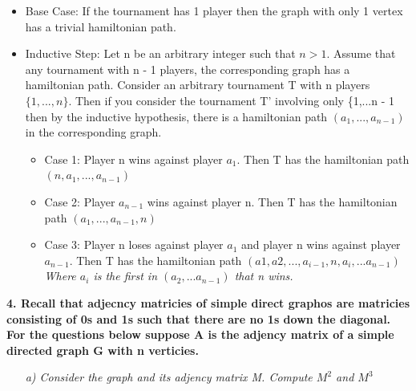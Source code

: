 \documentclass[12pt, letterpaper]{article}
\begin{document}
\begin{itemize}
\item \textnormal{ Base Case: } \newline
\textnormal{ If the tournament has 1 player then the graph with only 1 vertex has a trivial hamiltonian path. }

\item \textnormal{Inductive Step:} \newline
\textnormal{ Let n be an arbitrary integer such that \(n > 1\). Assume that any tournament with n - 1 players, the corresponding graph has a hamiltonian path. } \newline \newline 
\textnormal{ Consider an arbitrary tournament T with n players \(\{1, ..., n\}\). Then if you consider the tournament T' involving only \{1,...n - 1\, then by the inductive hypothesis, there is a hamiltonian path \((a_1,...,a_{n-1})\) in the corresponding graph. }

\begin{itemize}
\item \textnormal{Case 1: Player n wins against player \(a_1\). Then T has the hamiltonian path \((n, a_1,..., a_{n-1})\) }
\item \textnormal{Case 2: Player \(a_{n - 1}\) wins against player n. Then T has the hamiltonian path \((a_1,..., a_{n-1}, n)\) }
\item \textnormal{Case 3: Player n loses against player \(a_1\) and player n wins against player \(a_{n-1}\). Then T has the hamiltonian path \((a1, a2,..., a_{i - 1}, n, a_i,...a_{n-1} )\)} \newline \newline
\-\ \it{ Where \(a_i\) is the first in \((a_2,...a_{n-1})\) that n wins.  }

\end{itemize}
\end{itemize}

\newpage
\bf{ 4. Recall that adjecncy matricies of simple direct graphos are matricies consisting of 0s and 1s such that there are no 1s down the diagonal. For the questions below suppose A is the adjency matrix of a simple directed graph G with n verticies. }

\-\ \newline
\-\ \it{ a) Consider the graph and its adjency matrix M. Compute \(M^2\) and \(M^3\) }
\end{document}
